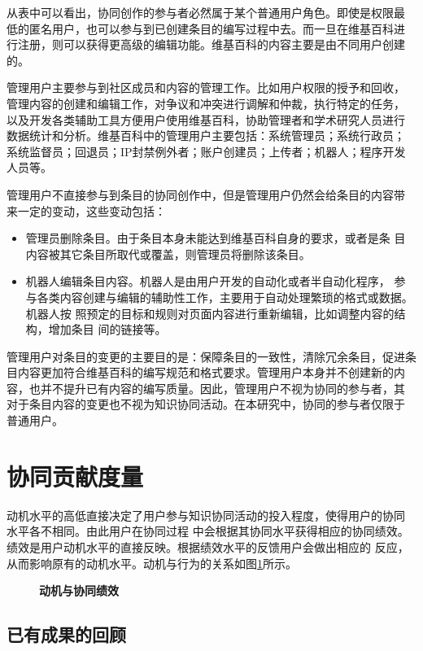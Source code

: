 从表中可以看出，协同创作的参与者必然属于某个普通用户角色。即使是权限最
低的匿名用户，也可以参与到已创建条目的编写过程中去。而一旦在维基百科进
行注册，则可以获得更高级的编辑功能。维基百科的内容主要是由不同用户创建
的。

管理用户主要参与到社区成员和内容的管理工作。比如用户权限的授予和回收，
管理内容的创建和编辑工作，对争议和冲突进行调解和仲裁，执行特定的任务，
以及开发各类辅助工具方便用户使用维基百科，协助管理者和学术研究人员进行
数据统计和分析。维基百科中的管理用户主要包括：系统管理员；系统行政员；
系统监督员；回退员；IP封禁例外者；账户创建员；上传者；机器人；程序开发
人员等。

管理用户不直接参与到条目的协同创作中，但是管理用户仍然会给条目的内容带
来一定的变动，这些变动包括：
\begin{itemize}
\item 管理员删除条目。由于条目本身未能达到维基百科自身的要求，或者是条
  目内容被其它条目所取代或覆盖，则管理员将删除该条目。
\item 机器人编辑条目内容。机器人是由用户开发的自动化或者半自动化程序，
  参与各类内容创建与编辑的辅助性工作，主要用于自动处理繁琐的格式或数据。机器人按
照预定的目标和规则对页面内容进行重新编辑，比如调整内容的结构，增加条目
间的链接等。
\end{itemize}
管理用户对条目的变更的主要目的是：保障条目的一致性，清除冗余条目，促进条
目内容更加符合维基百科的编写规范和格式要求。管理用户本身并不创建新的内
容，也并不提升已有内容的编写质量。因此，管理用户不视为协同的参与者，其
对于条目内容的变更也不视为知识协同活动。在本研究中，协同的参与者仅限于
普通用户。

\section{协同贡献度量}
动机水平的高低直接决定了用户参与知识协同活动的投入程度，使得用户的协同
水平各不相同。由此用户在协同过程
中会根据其协同水平获得相应的协同绩效。绩效是用户动机水平的直接反映。根据绩效水平的反馈用户会做出相应的
反应，从而影响原有的动机水平。动机与行为的关系如图\ref{fig:motive-behaviour}所示。

\begin{figure}[!htb]
  \centering
  \caption{\small{\textbf{动机与协同绩效}}}
  \label{fig:motive-behaviour}
\end{figure}
\subsection{已有成果的回顾}

